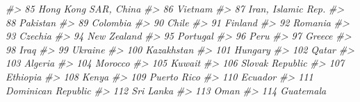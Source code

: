 \documentclass[
  xelatex, ja=standard]{bxjsbook}
\newenvironment{Shaded}{\begin{snugshade}}{\end{snugshade}}
\newcommand{\CommentTok}[1]{\textcolor[rgb]{0.56,0.35,0.01}{\textit{#1}}}
\theoremstyle{definition}
\theoremstyle{definition}
\theoremstyle{definition}
\theoremstyle{definition}
\theoremstyle{remark}
\begin{document}
\begin{Shaded}
\begin{Highlighting}[]
\CommentTok{\#\textgreater{} 85                                  Hong Kong SAR, China}
\CommentTok{\#\textgreater{} 86                                               Vietnam}
\CommentTok{\#\textgreater{} 87                                    Iran, Islamic Rep.}
\CommentTok{\#\textgreater{} 88                                              Pakistan}
\CommentTok{\#\textgreater{} 89                                              Colombia}
\CommentTok{\#\textgreater{} 90                                                 Chile}
\CommentTok{\#\textgreater{} 91                                               Finland}
\CommentTok{\#\textgreater{} 92                                               Romania}
\CommentTok{\#\textgreater{} 93                                               Czechia}
\CommentTok{\#\textgreater{} 94                                           New Zealand}
\CommentTok{\#\textgreater{} 95                                              Portugal}
\CommentTok{\#\textgreater{} 96                                                  Peru}
\CommentTok{\#\textgreater{} 97                                                Greece}
\CommentTok{\#\textgreater{} 98                                                  Iraq}
\CommentTok{\#\textgreater{} 99                                               Ukraine}
\CommentTok{\#\textgreater{} 100                                           Kazakhstan}
\CommentTok{\#\textgreater{} 101                                              Hungary}
\CommentTok{\#\textgreater{} 102                                                Qatar}
\CommentTok{\#\textgreater{} 103                                              Algeria}
\CommentTok{\#\textgreater{} 104                                              Morocco}
\CommentTok{\#\textgreater{} 105                                               Kuwait}
\CommentTok{\#\textgreater{} 106                                      Slovak Republic}
\CommentTok{\#\textgreater{} 107                                             Ethiopia}
\CommentTok{\#\textgreater{} 108                                                Kenya}
\CommentTok{\#\textgreater{} 109                                          Puerto Rico}
\CommentTok{\#\textgreater{} 110                                              Ecuador}
\CommentTok{\#\textgreater{} 111                                   Dominican Republic}
\CommentTok{\#\textgreater{} 112                                            Sri Lanka}
\CommentTok{\#\textgreater{} 113                                                 Oman}
\CommentTok{\#\textgreater{} 114                                            Guatemala}

\end{Highlighting}
\end{Shaded}
\end{document}
